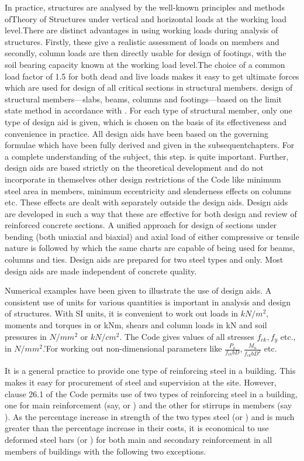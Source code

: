 In practice, structures are analysed by the well-known principles and
methods ofTheory of Structures under vertical and horizontal loads at the
working load level.There are distinct advantages in using working loads
during analysis of structures. Firstly, these give a realistic assessment
of loads on members and secondly, column loads are then directly usable
for design of footings, with the soil bearing capacity known at the working
load level.The choice of a common load factor of 1.5 for both dead and
live loads makes it easy to get ultimate forces which are used for
design of all critical sections in structural members. design of structural
members—slabs, beams, columns and footings—based on the limit state method 
in accordance with . For each type of structural member, only
one type of design aid is given, which is chosen on the basis of its
effectiveness and convenience in practice. All design aids have been 
based on the governing formulae which have been fully derived and given
in the subsequentchapters. For a complete understanding of the subject,
this step. is quite important. Further, design aids are based strictly
on the theoretical development and do not incorporate in themselves other
design restrictions of the Code like minimum steel area in members, minimum
eccentricity and slenderness effects on columns etc. These effects are
dealt with separately outside the design aids. Design aids are developed
in such a way that these are effective for both design and review of
reinforced concrete sections. A uniﬁed approach for design of sections
under bending (both uniaxial and biaxial) and axial load of either
compressive or tensile nature is followed by which the same charts are
capable of being used for beams, columns and ties. Design aids are
prepared for two steel types {\fetwofivezero}  and {\fefouronefive} only.
Most design aids are made independent of concrete quality.

Numerical examples have been given to illustrate the use of design aids.
A consistent use of units for various quantities is important in analysis
and design of structures. With SI units, it is convenient to work out
loads in $kN/m^2$, moments and torques in or kNm, shears and column
loads in kN and soil pressures in $N/mm^2$ or $kN/cm^2$. The Code
gives values of all stresses $f_{ck}, f_y$ etc., in $N/mm^2$.'For working
out non-dimensional parameters like $\frac{P_u}{f_{ck}bD},\frac{M_u}{f_{ck}bD^2}$
etc.


It is a general practice to provide one type of reinforcing steel in a
building. This makes it easy for procurement of steel and supervision 
at the site. However, clause 26.1 of the Code permits use of two types
of reinforcing steel in a building, one for main reinforcement (say,
{\fefouronefive} or {\fefivezerozero}) and the other for stirrups in members
(say {\fetwofivezero}).
As the percentage increase in strength of the two types steel
\fefouronefive
(or {\fefivezerozero}) and {\fetwofivezero} is much greater than the percentage increase in
their costs, it is economical to use deformed steel bars
{\fefouronefive} (or \fefivezerozero) for both main and secondary
reinforcement in all members of buildings with the following two exceptions.

